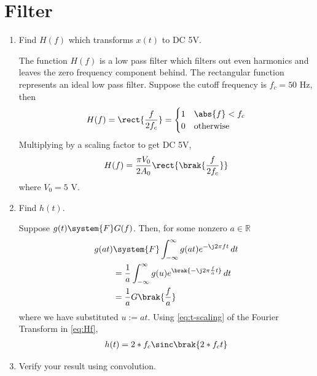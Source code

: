\documentclass[journal,12pt,twocolumn]{IEEEtran}
\renewcommand\thesection{\arabic{section}}
\begin{document}
\section{Filter}
\begin{enumerate}[label=\thesection.\arabic*
,ref=\thesection.\theenumi]
\item Find $H(f)$ which transforms $x(t)$ to DC 5V.

\solution The function $H(f)$ is a low pass filter which filters out
even harmonics and leaves the zero frequency component behind.
The rectangular function represents an ideal low pass filter. 
Suppose the cutoff frequency is $f_c = 50$ Hz, then
\begin{align}
    H(f) = \rect{\frac{f}{2f_c}} =
    \begin{cases}
        1 & \abs{f} < f_c \\
        0 & \textrm{otherwise}
    \end{cases}
    \label{eq:Hf}
\end{align}
Multiplying by a scaling factor to get DC 5V,
\begin{align}
    H(f) = \frac{\pi V_0}{2A_0}\rect{\brak{\frac{f}{2f_c}}}
\end{align}
where $V_0 = 5$ V.
\item Find $h(t)$.

\solution Suppose $g(t)\system{F}G(f)$. Then, for some
nonzero $a \in \mathbb{R}$
\begin{align}
    g(at)&\system{F}\int_{-\infty}^{\infty}g(at)e^{-\j2\pi ft}\, dt \\
         &=\frac{1}{a}\int_{-\infty}^{\infty}g(u)e^{\brak{-\j2\pi \frac{f}{a}t}}\, dt \\
         &=\frac{1}{a}G\brak{\frac{f}{a}}
         \label{eq:t-scaling}
\end{align}
where we have substituted $u := at$. Using 
\eqref{eq:t-scaling} of the Fourier Transform in \eqref{eq:Hf},
\begin{align}
    h(t) = 2*f_c\sinc\brak{2*f_ct}
\end{align}
\item Verify your result using convolution.


\end{enumerate}
\end{document}
